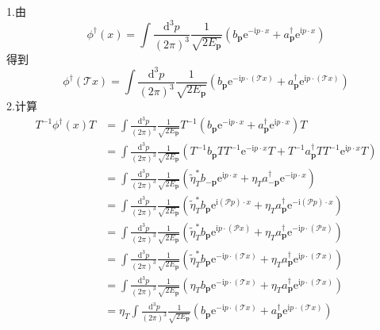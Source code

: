 1.由
\begin{equation}
    \phi ^{\dagger}(x)=\int{\frac{\mathrm{d}^3p}{\left( 2\pi \right) ^3}}\frac{1}{\sqrt{2E_{\mathbf{p}}}}\left( b_{\mathbf{p}}\mathrm{e}^{-\mathrm{i}p\cdot x}+a_{\mathbf{p}}^{\dagger}\mathrm{e}^{\mathrm{i}p\cdot x} \right) 
\end{equation}
得到
\begin{equation}
    \phi ^{\dagger}(\mathcal{T} x)=\int{\frac{\mathrm{d}^3p}{\left( 2\pi \right) ^3}}\frac{1}{\sqrt{2E_{\mathbf{p}}}}\left( b_{\mathbf{p}}\mathrm{e}^{-\mathrm{i}p\cdot \left( \mathcal{T} x \right)}+a_{\mathbf{p}}^{\dagger}\mathrm{e}^{\mathrm{i}p\cdot \left( \mathcal{T} x \right)} \right) 
\end{equation}
2.计算
\begin{equation}
    \begin{aligned}
        T^{-1}\phi ^{\dagger}\left( x \right) T&=\int{\frac{\mathrm{d}^3p}{\left( 2\pi \right) ^3}}\frac{1}{\sqrt{2E_{\mathbf{p}}}}T^{-1}\left( b_{\mathbf{p}}\mathrm{e}^{-\mathrm{i}p\cdot x}+a_{\mathbf{p}}^{\dagger}\mathrm{e}^{\mathrm{i}p\cdot x} \right) T
\\
&=\int{\frac{\mathrm{d}^3p}{\left( 2\pi \right) ^3}}\frac{1}{\sqrt{2E_{\mathbf{p}}}}\left( T^{-1}b_{\mathbf{p}}TT^{-1}\mathrm{e}^{-\mathrm{i}p\cdot x}T+T^{-1}a_{\mathbf{p}}^{\dagger}TT^{-1}\mathrm{e}^{\mathrm{i}p\cdot x}T \right) 
\\
&=\int{\frac{\mathrm{d}^3p}{\left( 2\pi \right) ^3}}\frac{1}{\sqrt{2E_{\mathbf{p}}}}\left( \tilde{\eta}_{T}^{*}b_{-\mathbf{p}}\mathrm{e}^{\mathrm{i}p\cdot x}+\eta _Ta_{-\mathbf{p}}^{\dagger}\mathrm{e}^{-\mathrm{i}p\cdot x} \right) 
\\
&=\int{\frac{\mathrm{d}^3p}{\left( 2\pi \right) ^3}}\frac{1}{\sqrt{2E_{\mathbf{p}}}}\left( \tilde{\eta}_{T}^{*}b_{\mathbf{p}}\mathrm{e}^{\mathrm{i}\left( \mathcal{P} p \right) \cdot x}+\eta _Ta_{\mathbf{p}}^{\dagger}\mathrm{e}^{-\mathrm{i}\left( \mathcal{P} p \right) \cdot x} \right) 
\\
&=\int{\frac{\mathrm{d}^3p}{\left( 2\pi \right) ^3}}\frac{1}{\sqrt{2E_{\mathbf{p}}}}\left( \tilde{\eta}_{T}^{*}b_{\mathbf{p}}\mathrm{e}^{\mathrm{i}p\cdot \left( \mathcal{P} x \right)}+\eta _Ta_{\mathbf{p}}^{\dagger}\mathrm{e}^{-\mathrm{i}p\cdot \left( \mathcal{P} x \right)} \right) 
\\
&=\int{\frac{\mathrm{d}^3p}{\left( 2\pi \right) ^3}}\frac{1}{\sqrt{2E_{\mathbf{p}}}}\left( \tilde{\eta}_{T}^{*}b_{\mathbf{p}}\mathrm{e}^{-\mathrm{i}p\cdot (\mathcal{T} x)}+\eta _Ta_{\mathbf{p}}^{\dagger}\mathrm{e}^{\mathrm{i}p\cdot (\mathcal{T} x)} \right) 
\\
&=\int{\frac{\mathrm{d}^3p}{\left( 2\pi \right) ^3}}\frac{1}{\sqrt{2E_{\mathbf{p}}}}\left( \eta _Tb_{\mathbf{p}}\mathrm{e}^{-\mathrm{i}p\cdot (\mathcal{T} x)}+\eta _Ta_{\mathbf{p}}^{\dagger}\mathrm{e}^{\mathrm{i}p\cdot (\mathcal{T} x)} \right) 
\\
&=\eta _T\int{\frac{\mathrm{d}^3p}{\left( 2\pi \right) ^3}}\frac{1}{\sqrt{2E_{\mathbf{p}}}}\left( b_{\mathbf{p}}\mathrm{e}^{-\mathrm{i}p\cdot (\mathcal{T} x)}+a_{\mathbf{p}}^{\dagger}\mathrm{e}^{\mathrm{i}p\cdot (\mathcal{T} x)} \right) 
    \end{aligned}
\end{equation}
